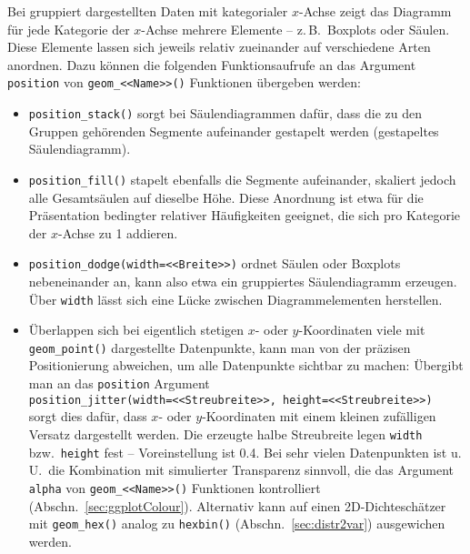 Bei gruppiert dargestellten Daten mit kategorialer $x$-Achse zeigt das Diagramm für jede Kategorie der $x$-Achse mehrere Elemente -- z.\,B.\ Boxplots oder Säulen. Diese Elemente lassen sich jeweils relativ zueinander auf verschiedene Arten anordnen. Dazu können die folgenden Funktionsaufrufe an das Argument \lstinline!position! von \lstinline!geom_<<Name>>()! Funktionen übergeben werden:
\begin{itemize}
\item {} \lstinline!position_stack()! sorgt bei Säulendiagrammen dafür, dass die zu den Gruppen gehörenden Segmente aufeinander gestapelt werden (gestapeltes Säulendiagramm).
\item {} \lstinline!position_fill()! stapelt ebenfalls die Segmente aufeinander, skaliert jedoch alle Gesamtsäulen auf dieselbe Höhe. Diese Anordnung ist etwa für die Präsentation bedingter relativer Häufigkeiten geeignet, die sich pro Kategorie der $x$-Achse zu 1 addieren.
\item {} \lstinline!position_dodge(width=<<Breite>>)! ordnet Säulen oder Boxplots nebeneinander an, kann also etwa ein gruppiertes Säulendiagramm erzeugen. Über \lstinline!width! lässt sich eine Lücke zwischen Diagrammelementen herstellen.
\item Überlappen sich bei eigentlich stetigen $x$- oder $y$-Koordinaten viele mit \lstinline!geom_point()! dargestellte Datenpunkte, kann man von der präzisen Positionierung abweichen, um alle Datenpunkte sichtbar zu machen: Übergibt man an das \lstinline!position! Argument \\
\lstinline!position_jitter(width=<<Streubreite>>, height=<<Streubreite>>)!\\
sorgt dies dafür, dass $x$- oder $y$-Koordinaten mit einem kleinen zufälligen Versatz dargestellt werden. Die erzeugte halbe Streubreite legen \lstinline!width! bzw.\ \lstinline!height! fest -- Voreinstellung ist 0.4. Bei sehr vielen Datenpunkten ist u.\,U.\ die Kombination mit simulierter Transparenz sinnvoll, die das Argument \lstinline!alpha! von \lstinline!geom_<<Name>>()! Funktionen kontrolliert (Abschn.\ \ref{sec:ggplotColour}). Alternativ kann auf einen 2D-Dichteschätzer mit \lstinline!geom_hex()! analog zu \lstinline!hexbin()! (Abschn.\ \ref{sec:distr2var}) ausgewichen werden.
\end{itemize}

